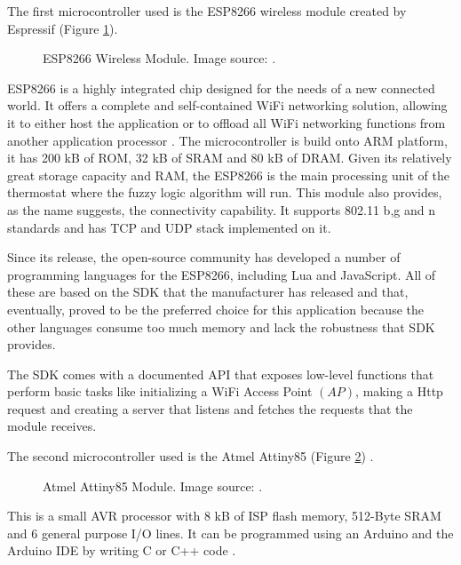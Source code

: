 \documentclass[conference]{IEEEtran}
\begin{document}
The first microcontroller used is the ESP8266 wireless module created by Espressif (Figure \ref{fig:esp8266}).

\begin{figure}[h!]
\label{fig:esp8266}
\centerline{}
      \caption[ESP8266]{ESP8266 Wireless Module. Image source: \cite{website:esppicture}.}
\label{fig:esp8266}
\end{figure}

ESP8266 is a highly integrated chip designed for the needs of a new connected world. It offers a complete and
self-contained WiFi networking solution, allowing it to either host the application or to offload all WiFi
networking functions from another application processor \cite{website:espressifdesc}.
The microcontroller is build onto ARM platform, it has 200 kB of ROM, 32 kB of SRAM and 80 kB of DRAM.
Given its relatively great storage capacity and RAM, the ESP8266 is the main processing unit of the thermostat
where the fuzzy logic algorithm will run.
This module also provides, as the name suggests, the connectivity capability. It supports 802.11 b,g and n
standards and has TCP and UDP stack implemented on it.

Since its release, the open-source community has developed a number of programming languages for the ESP8266,
including Lua\cite{website:nodemcu} and JavaScript\cite{website:espruino}. All of these are based on the SDK
that the manufacturer has released and that, eventually, proved to be the preferred choice for this
application because the other languages consume too much memory and lack the robustness that SDK provides.

The SDK comes with a documented API that exposes low-level functions that perform basic tasks like initializing
a WiFi Access Point $(AP)$, making a Http request and creating a server that listens and fetches the requests
that the module receives.

The second microcontroller used is the Atmel Attiny85 (Figure \ref{fig:attiny85}) \cite{website:attiny85}.

\begin{figure}[h!]
\label{fig:attiny85}
\centerline{}
      \caption[attiny85]{Atmel Attiny85 Module. Image source: \cite{website:attiny85pic}.}
\label{fig:attiny85}
\end{figure}

This is a small AVR processor with 8 kB of ISP flash memory, 512-Byte SRAM and 6 general purpose I/O lines.
It can be programmed using an Arduino and the Arduino IDE by writing C or C++ code \cite{website:attiny85program}.
\end{document}

